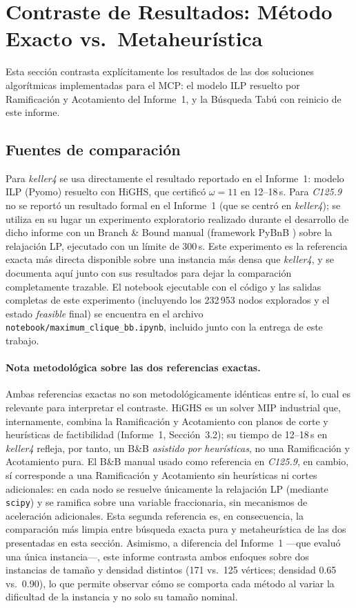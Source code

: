 \section{Contraste de Resultados: Método Exacto vs.\ Metaheurística}\label{sec:contraste}

Esta sección contrasta explícitamente los resultados de las dos soluciones algorítmicas implementadas para el MCP: el modelo ILP resuelto por Ramificación y Acotamiento del Informe~1, y la Búsqueda Tabú con reinicio de este informe.

\subsection{Fuentes de comparación}

Para \textit{keller4} se usa directamente el resultado reportado en el Informe~1: modelo ILP (Pyomo) resuelto con HiGHS, que certificó $\omega=11$ en 12--18\,s. Para \textit{C125.9} no se reportó un resultado formal en el Informe~1 (que se centró en \textit{keller4}); se utiliza en su lugar un experimento exploratorio realizado durante el desarrollo de dicho informe con un Branch \& Bound manual (framework PyBnB \parencite{pybnb}) sobre la relajación LP, ejecutado con un límite de 300\,s. Este experimento es la referencia exacta más directa disponible sobre una instancia más densa que \textit{keller4}, y se documenta aquí junto con sus resultados para dejar la comparación completamente trazable. El notebook ejecutable con el código y las salidas completas de este experimento (incluyendo los 232\,953 nodos explorados y el estado \textit{feasible} final) se encuentra en el archivo \texttt{notebook/maximum\_clique\_bb.ipynb}, incluido junto con la entrega de este trabajo.

\paragraph{Nota metodológica sobre las dos referencias exactas.} Ambas referencias exactas no son metodológicamente idénticas entre sí, lo cual es relevante para interpretar el contraste. HiGHS es un solver MIP industrial que, internamente, combina la Ramificación y Acotamiento con planos de corte y heurísticas de factibilidad (Informe~1, Sección~3.2); su tiempo de 12--18\,s en \textit{keller4} refleja, por tanto, un B\&B \emph{asistido por heurísticas}, no una Ramificación y Acotamiento pura. El B\&B manual usado como referencia en \textit{C125.9}, en cambio, sí corresponde a una Ramificación y Acotamiento sin heurísticas ni cortes adicionales: en cada nodo se resuelve únicamente la relajación LP (mediante \texttt{scipy}) y se ramifica sobre una variable fraccionaria, sin mecanismos de aceleración adicionales. Esta segunda referencia es, en consecuencia, la comparación más limpia entre búsqueda exacta pura y metaheurística de las dos presentadas en esta sección. Asimismo, a diferencia del Informe~1 —que evaluó una única instancia—, este informe contrasta ambos enfoques sobre dos instancias de tamaño y densidad distintos (171 vs.\ 125 vértices; densidad 0.65 vs.\ 0.90), lo que permite observar cómo se comporta cada método al variar la dificultad de la instancia y no solo su tamaño nominal.

